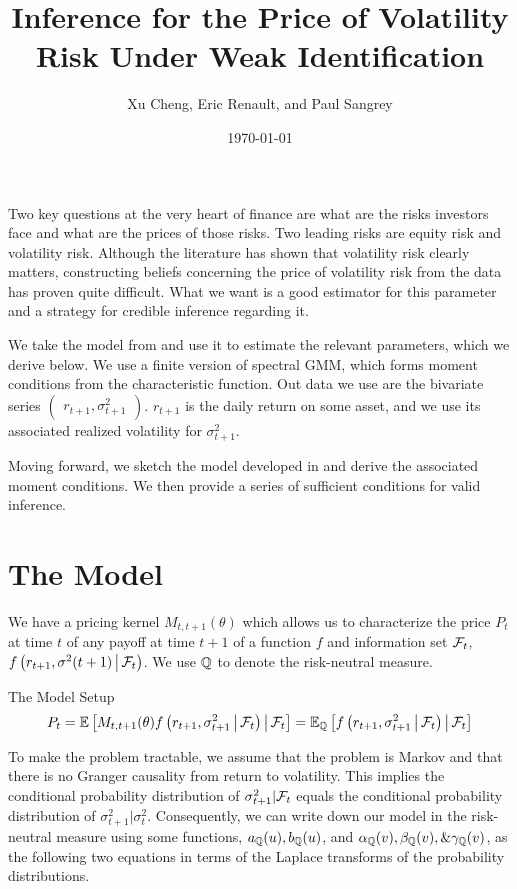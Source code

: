 \documentclass[11pt, letterpaper, twoside, final]{article}
\author{Xu Cheng, Eric Renault, and Paul Sangrey}
\title{Inference for the Price of Volatility Risk Under Weak Identification}
\date{\today}
\begin{document}
\maketitle


Two key questions at the very heart of finance are what are the risks investors face and what are the prices of
those risks.
Two leading risks are equity risk and volatility risk.
Although the literature has shown that volatility risk clearly matters, constructing beliefs concerning the price
of volatility risk from the data has proven quite difficult.
What we want is a good estimator for this parameter and a strategy for credible inference regarding it.  

We take the model from \textcite{khrapov2016affine} and use it to estimate the relevant
parameters, which we derive below. 
We use a finite version of spectral GMM, which forms moment conditions from the characteristic function.
Out data we use are the bivariate series $\begin{pmatrix} r_{t+1}, \sigma^2_{t+1} \end{pmatrix}$.
$r_{t+1}$ is the daily return on some asset, and we use its associated realized volatility for $\sigma^2_{t+1}$.

Moving forward, we sketch the model developed in \textcite{khrapov2016affine} and derive the associated moment
conditions.
We then provide a series of sufficient conditions for valid inference. 

\section{The Model}

We have a pricing kernel $M_{t, t+1}(\theta)$ which allows us to characterize the price $P_t$ at time $t$ of any
payoff at time $t+1$ of a function $f$ and information set $\mathcal{F}_t$, $f\left(r_{t+1}, \sigma^2(t+1) \,\middle\vert\,
\mathcal{F}_t\right)$. 
We use $\mathbb{Q}$ to denote the risk-neutral measure.

\begin{defn}{The Model Setup}
    \begin{equation}
        P_t  = \mathbb{E}\left[M_{t,t+1}(\theta) f\left(r_{t+1}, \sigma^2_{t+1} \,\middle\vert\,  \mathcal{F}_t\right) \,\middle\vert\, \mathcal{F}_t \right] =
        \mathbb{E}_{\mathbb{Q}}\left[f\left(r_{t+1}, \sigma^2_{t+1} \,\middle\vert\,  \mathcal{F}_t\right) \,\middle\vert\, \mathcal{F}_t \right] 
    \end{equation}
\end{defn}

To make the problem tractable, we assume that the problem is Markov and that there is no Granger causality from
return to volatility. 
This implies the conditional probability distribution of $\sigma^2_{t+1} \vert \mathcal{F}_t$ equals the conditional
probability distribution of $\sigma^2_{t+1} \vert \sigma^2_t$.
Consequently, we can write down our model in the risk-neutral measure using some functions, $a_{\mathbb{Q}}(u),
b_{\mathbb{Q}}(u)$, and $\alpha_{\mathbb{Q}}(v), \beta_{\mathbb{Q}}(v), \& \gamma_{\mathbb{Q}}(v)$, as the following two equations in terms of the
Laplace transforms of the probability distributions.
\end{document}
